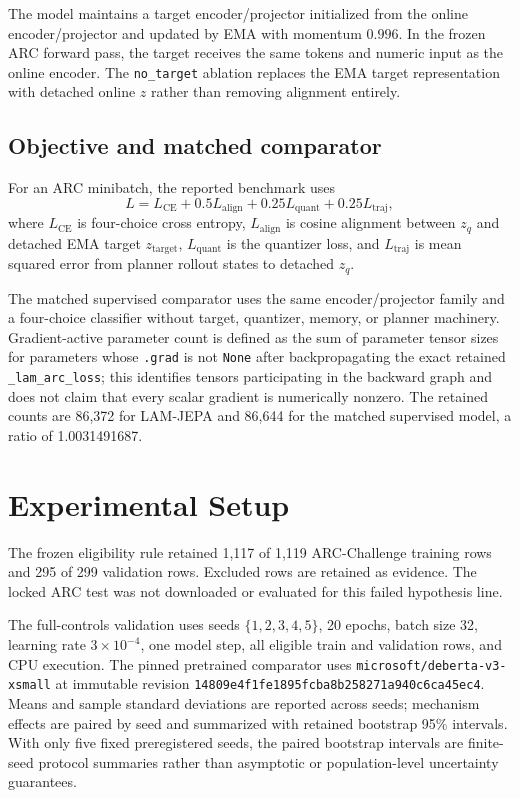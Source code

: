 \documentclass[twoside]{article}
\begin{document}
The model maintains a target encoder/projector initialized from the online encoder/projector and updated by EMA with momentum $0.996$. In the frozen ARC forward pass, the target receives the same tokens and numeric input as the online encoder. The \texttt{no\_target} ablation replaces the EMA target representation with detached online $z$ rather than removing alignment entirely.

\subsection{Objective and matched comparator}
For an ARC minibatch, the reported benchmark uses
\[
L = L_{\mathrm{CE}} + 0.5L_{\mathrm{align}} + 0.25L_{\mathrm{quant}} + 0.25L_{\mathrm{traj}},
\]
where $L_{\mathrm{CE}}$ is four-choice cross entropy, $L_{\mathrm{align}}$ is cosine alignment between $z_q$ and detached EMA target $z_{\mathrm{target}}$, $L_{\mathrm{quant}}$ is the quantizer loss, and $L_{\mathrm{traj}}$ is mean squared error from planner rollout states to detached $z_q$.

The matched supervised comparator uses the same encoder/projector family and a four-choice classifier without target, quantizer, memory, or planner machinery. Gradient-active parameter count is defined as the sum of parameter tensor sizes for parameters whose \texttt{.grad} is not \texttt{None} after backpropagating the exact retained \texttt{\_lam\_arc\_loss}; this identifies tensors participating in the backward graph and does not claim that every scalar gradient is numerically nonzero. The retained counts are 86,372 for LAM-JEPA and 86,644 for the matched supervised model, a ratio of 1.0031491687.



\section{Experimental Setup}
The frozen eligibility rule retained 1,117 of 1,119 ARC-Challenge training rows and 295 of 299 validation rows. Excluded rows are retained as evidence. The locked ARC test was not downloaded or evaluated for this failed hypothesis line.

The full-controls validation uses seeds $\{1,2,3,4,5\}$, 20 epochs, batch size 32, learning rate $3\times10^{-4}$, one model step, all eligible train and validation rows, and CPU execution. The pinned pretrained comparator uses \texttt{microsoft/deberta-v3-xsmall} at immutable revision \texttt{14809e4f1fe1895fcba8b258271a940c6ca45ec4}. Means and sample standard deviations are reported across seeds; mechanism effects are paired by seed and summarized with retained bootstrap 95\% intervals. With only five fixed preregistered seeds, the paired bootstrap intervals are finite-seed protocol summaries rather than asymptotic or population-level uncertainty guarantees.
\end{document}
